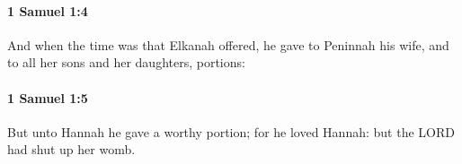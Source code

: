 		\paragraph{1 Samuel 1:4} %
			\label{1SAMUEL-1-4}

			And when the time was that Elkanah offered, he gave to Peninnah his wife, and to all her sons and her daughters, portions:


		\paragraph{1 Samuel 1:5} %
			\label{1SAMUEL-1-5}

			But unto Hannah he gave a worthy portion; for he loved Hannah: but the LORD had shut up her womb.



